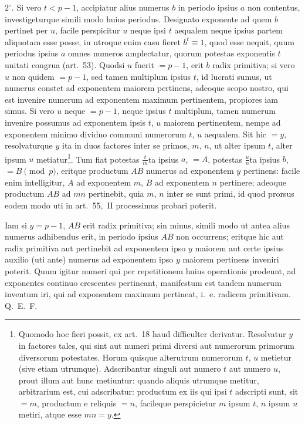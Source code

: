 \documentclass[12pt,a4paper]{article}
\theoremstyle{plain}
\theoremstyle{definition}
\theoremstyle{remark}
\begin{document}
$2^\circ$. Si vero $t < p-1$, accipiatur alius numerus $b$ in periodo ipsius $a$ non contentus, investigeturque simili modo huius periodus. Designato exponente ad quem $b$ pertinet per $u$, facile perspicitur $u$ neque ipsi $t$ aequalem neque ipsius partem aliquotam esse posse, in utroque enim casu fieret $b^t \equiv 1$, quod esse nequit, quum periodus ipsius $a$ omnes numeros amplectatur, quorum potestas exponentis $t$ unitati congrua (art.~53). Quodsi $u$ fuerit $=p-1$, erit $b$ radix primitiva; si vero $u$ non quidem $=p-1$, sed tamen multiplum ipsius $t$, id lucrati sumus, ut numerus constet ad exponentem maiorem pertinens, adeoque scopo nostro, qui est invenire numerum ad exponentem maximum pertinentem, propiores iam simus. Si vero $u$ neque $=p-1$, neque ipsius $t$ multiplum, tamen numerum invenire possumus ad exponentem ipsis $t$, $u$ maiorem pertinentem, nempe ad exponentem minimo dividuo communi numerorum $t$, $u$ aequalem. Sit hic $=y$, resolvaturque $y$ ita in duos factores inter se primos, $m$, $n$, ut alter ipsum $t$, alter ipsum $u$ metiatur\footnote{Quomodo hoc fieri possit, ex art.~18 haud difficulter derivatur. Resolvatur $y$ in factores tales, qui sint aut numeri primi diversi aut numerorum primorum diversorum potestates. Horum quisque alterutrum numerorum $t$, $u$ metietur (sive etiam utrumque). Adscribantur singuli aut numero $t$ aut numero $u$, prout illum aut hunc metiuntur: quando aliquis utrumque metitur, arbitrarium est, cui adscribatur: productum ex iis qui ipsi $t$ adscripti sunt, sit $=m$, productum e reliquis $=n$, facileque perspicietur $m$ ipsum $t$, $n$ ipsum $u$ metiri, atque esse $mn=y$.}. Tum fiat potestas $\frac{t}{m}$ta ipsius $a$, $=A$, potestas $\frac{u}{n}$ta ipsius $b$, $=B \pmod{p}$, eritque productum $AB$ numerus ad exponentem $y$ pertinens: facile enim intelligitur, $A$ ad exponentem $m$, $B$ ad exponentem $n$ pertinere; adeoque productum $AB$ ad $mn$ pertinebit, quia $m$, $n$ inter se sunt primi, id quod prorsus eodem modo uti in art.~55,~II processimus probari poterit.

Iam si $y=p-1$, $AB$ erit radix primitiva; sin minus, simili modo ut antea alius numerus adhibendus erit, in periodo ipsius $AB$ non occurrens; eritque hic aut radix primitiva aut pertinebit ad exponentem ipso $y$ maiorem aut certe ipsius auxilio (uti ante) numerus ad exponentem ipso $y$ maiorem pertinens inveniri poterit. Quum igitur numeri qui per repetitionem huius operationis prodeunt, ad exponentes continuo crescentes pertineant, manifestum est tandem numerum inventum iri, qui ad exponentem maximum pertineat, i.~e. radicem primitivam. Q.~E.~F.
\end{document}
